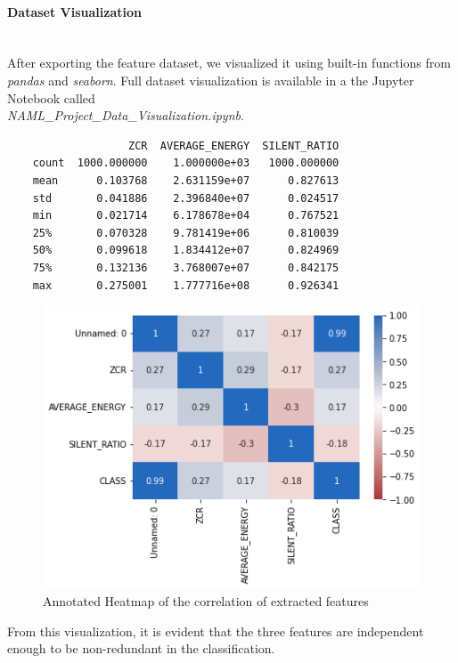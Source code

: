 \documentclass[12pt]{article}
\begin{document}
	\paragraph{Dataset Visualization}\mbox{}\\\newline
	After exporting the feature dataset, we visualized it using built-in functions from \textit{pandas} and \textit{seaborn}. Full dataset visualization is available in a the Jupyter Notebook called\\ \textit{NAML\_Project\_Data\_Visualization.ipynb}.
	
	\begin{lstlisting}
    		       ZCR  AVERAGE_ENERGY  SILENT_RATIO
	count  1000.000000    1.000000e+03   1000.000000
	mean      0.103768    2.631159e+07      0.827613
	std       0.041886    2.396840e+07      0.024517
	min       0.021714    6.178678e+04      0.767521 
	25%       0.070328    9.781419e+06      0.810039
	50%       0.099618    1.834412e+07      0.824969
	75%       0.132136    3.768007e+07      0.842175
	max       0.275001    1.777716e+08      0.926341
	\end{lstlisting}
	
	\begin{figure}[H]
		\hspace{100pt}\includegraphics[scale=0.7]{visual_8_1}
		\caption{Annotated Heatmap of the correlation of extracted features}
	\end{figure}
	From this visualization, it is evident that the three features are independent enough to be non-redundant in the classification. 
	
\end{document}
